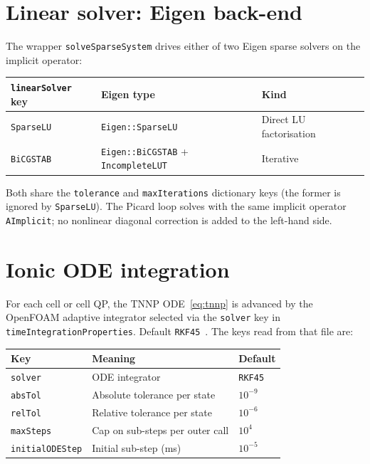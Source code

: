 \documentclass[11pt,a4paper]{article}
\newcommand{\code}[1]{\texttt{\small #1}}
\begin{document}
\section{Linear solver: Eigen back-end}

The wrapper \code{solveSparseSystem} drives either of two Eigen sparse
solvers on the implicit operator:
\begin{center}
\begin{tabular}{@{}lll@{}}
\toprule
\code{linearSolver} key & Eigen type & Kind \\
\midrule
\code{SparseLU}  & \code{Eigen::SparseLU} & Direct LU factorisation \\
\code{BiCGSTAB}  & \code{Eigen::BiCGSTAB} + \code{IncompleteLUT} & Iterative \\
\bottomrule
\end{tabular}
\end{center}

Both share the \code{tolerance} and \code{maxIterations} dictionary
keys (the former is ignored by \code{SparseLU}). The Picard loop solves
with the same implicit operator \code{AImplicit}; no nonlinear diagonal
correction is added to the left-hand side.

\section{Ionic ODE integration}

For each cell or cell QP, the TNNP ODE~\eqref{eq:tnnp} is advanced by
the OpenFOAM adaptive integrator selected via the \code{solver} key in
\code{timeIntegrationProperties}. Default \code{RKF45}~\cite{hairer2}.
The keys read from that file are:

\begin{center}
\begin{tabular}{@{}lll@{}}
\toprule
Key & Meaning & Default \\
\midrule
\code{solver} & ODE integrator & \code{RKF45} \\
\code{absTol} & Absolute tolerance per state & $10^{-9}$ \\
\code{relTol} & Relative tolerance per state & $10^{-6}$ \\
\code{maxSteps} & Cap on sub-steps per outer call & $10^{4}$ \\
\code{initialODEStep} & Initial sub-step (ms) & $10^{-5}$ \\
\bottomrule
\end{tabular}
\end{center}
\end{document}
